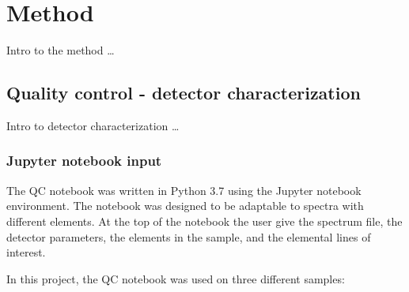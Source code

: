 \chapter{Method}
\label{ch:method}

Intro to the method \dots


\section{Quality control - detector characterization}
\label{method:qc}

Intro to detector characterization \dots

\subsection{Jupyter notebook input}
\label{method:qc:input}

The QC notebook was written in Python 3.7 using the Jupyter notebook environment.
The notebook was designed to be adaptable to spectra with different elements.
At the top of the notebook the user give the spectrum file, the detector parameters, the elements in the sample, and the elemental lines of interest.

In this project, the QC notebook was used on three different samples: 





